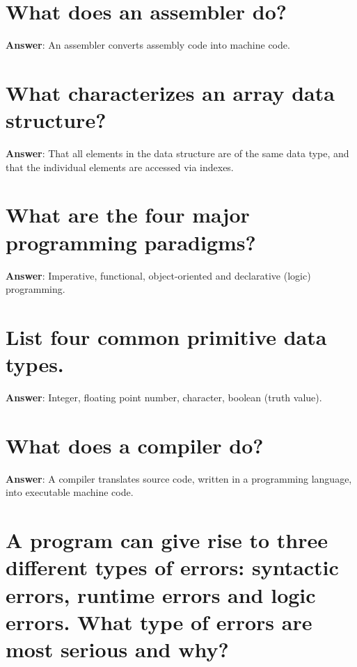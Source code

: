 \documentclass[a4paper,11pt,oneside]{book}
\begin{document}
\begin{sloppypar}
\section{What does an assembler do?}

\label{q:197:sa:en:True}

\textbf{Answer}: An assembler converts assembly code into machine code.



\section{What characterizes an array data structure?}

\label{q:198:sa:en:True}

\textbf{Answer}: That all elements in the data structure are of the same data type, and that the individual elements are accessed via indexes.



\section{What are the four major programming paradigms?}

\label{q:199:sa:en:True}

\textbf{Answer}: Imperative, functional, object-oriented and declarative (logic) programming.



\section{List four common primitive data types.}

\label{q:200:sa:en:True}

\textbf{Answer}: Integer, floating point number, character, boolean (truth value).



\section{What does a compiler do?}

\label{q:201:sa:en:True}

\textbf{Answer}: A compiler translates source code, written in a programming language, into executable machine code.



\section{A program can give rise to three different types of errors: syntactic errors, runtime errors and logic errors. What type of errors are most serious and why?}


\end{sloppypar}
\end{document}
